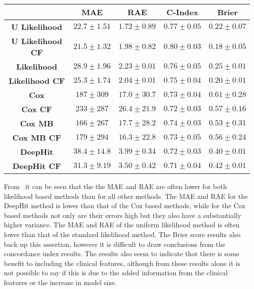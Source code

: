\begin{table*}
        \resizebox*{1.0\linewidth}{!}
        {
            \begin{tabular}{||c|cc|c|c||}
                \hline
                                            & \textbf{\gls{MAE}} & \textbf{\gls{RAE}} & \textbf{C-Index}  & \textbf{Brier}    \\
                \hline
                \textbf{U Likelihood}       & $22.7\pm1.51$      & $1.72\pm0.89$      & $0.77\pm0.05$     & $0.22\pm0.07$      \\
                \textbf{U Likelihood CF}    & $21.5\pm1.32$      & $1.98\pm0.82$      & $0.80\pm0.03$     & $0.18\pm0.05$      \\
                \textbf{Likelihood}         & $28.9\pm1.96$      & $2.23\pm0.01$      & $0.76\pm0.05$     & $0.25\pm0.01$      \\
                \textbf{Likelihood CF}      & $25.3\pm1.74$      & $2.04\pm0.01$      & $0.75\pm0.04$     & $0.20\pm0.01$      \\
                \hline
                \textbf{Cox}                & $187 \pm309 $      & $17.0\pm30.7$      & $0.73\pm0.04$     & $0.61\pm0.28$      \\
                \textbf{Cox CF}             & $233 \pm287 $      & $26.4\pm21.9$      & $0.72\pm0.03$     & $0.57\pm0.16$      \\
                \textbf{Cox \gls{MB}}       & $166 \pm267 $      & $17.7\pm28.2$      & $0.74\pm0.03$     & $0.53\pm0.31$      \\
                \textbf{Cox \gls{MB} CF}    & $179 \pm294 $      & $16.3\pm22.8$      & $0.73\pm0.05$     & $0.56\pm0.24$      \\
                \hline
                \textbf{DeepHit}            & $38.4\pm14.8$      & $3.99\pm0.34$      & $0.72\pm0.03$     & $0.40\pm0.01$      \\
                \textbf{DeepHit CF}         & $31.3\pm9.19$      & $3.50\pm0.42$      & $0.71\pm0.04$     & $0.42\pm0.01$      \\
                \hline
            \end{tabular}
        }
        \label{tab:table}
        
    \end{table*}

    From~ it can be seen that the the \gls{MAE} and \gls{RAE} are often lower for both likelihood based methods than for all other methods. The \gls{MAE} and \gls{RAE} for the DeepHit method is lower than that of the Cox based methods, while for the Cox based methods not only are their errors high but they also have a substantially higher variance. The \gls{MAE} and \gls{RAE} of the uniform likelihood method is often lower than that of the standard likelihood method. The Brier score results also back up this assertion, however it is difficult to draw conclusions from the concordance index results. The results also seem to indicate that there is some benefit to including the clinical features, although from these results alone it is not possible to say if this is due to the added information from the clinical features or the increase in model size.
